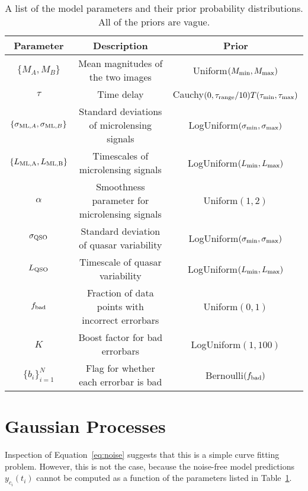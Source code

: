 \documentclass[a4paper, 10pt]{article}
\begin{document}
\begin{table}[h!]
\begin{center}
\begin{tabular}{|c|c|c|}
\hline
Parameter & Description & Prior\\
\hline
$\{M_A, M_B\}$ & Mean magnitudes of the two images & Uniform$(M_{\rm min}, M_{\rm max})$\\
$\tau$ & Time delay & Cauchy$(0, \tau_{\rm range}/10)T(\tau_{\rm min}, \tau_{\rm max})$\\
$\{\sigma_{{\rm ML}, A}, \sigma_{{\rm ML}, B}\}$ & Standard deviations of microlensing signals & LogUniform$(\sigma_{\rm min}, \sigma_{\rm max})$\\
$\{L_{{\rm ML, A}}, L_{{\rm ML, B}}\}$ & Timescales of microlensing signals & LogUniform$(L_{\rm min}, L_{\rm max})$\\
$\alpha$ & Smoothness parameter for microlensing signals & Uniform$(1,2)$\\
$\sigma_{\rm QSO}$ & Standard deviation of quasar variability & LogUniform$(\sigma_{\rm min}, \sigma_{\rm max})$\\
$L_{\rm QSO}$ & Timescale of quasar variability & LogUniform$(L_{\rm min}, L_{\rm max})$\\
$f_{\rm bad}$ & Fraction of data points with incorrect errorbars & Uniform$(0,1)$\\
$K$ & Boost factor for bad errorbars & LogUniform$(1, 100)$\\
$\{b_i\}_{i=1}^N$ & Flag for whether each errorbar is bad & Bernoulli$(f_{\rm bad})$\\
\hline
\end{tabular}
\end{center}
\caption{A list of the model parameters and their prior probability
distributions. All of the priors are vague.\label{tab:params}}
\end{table}

\section{Gaussian Processes}
Inspection of Equation~\ref{eq:noise} suggests that this is a simple curve
fitting problem. However, this is not the case, because the noise-free
model predictions $y_{c_i}(t_i)$ cannot be computed as a function of the
parameters listed in Table~\ref{tab:params}.
\end{document}
